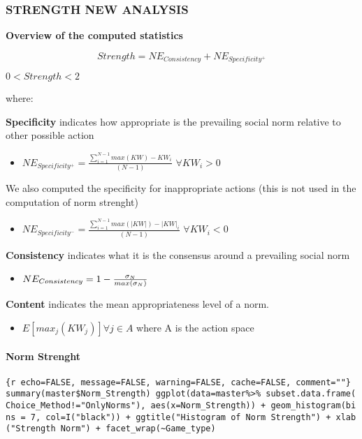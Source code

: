 \hypertarget{strength-new-analysis}{%
\subsubsection{STRENGTH NEW ANALYSIS}\label{strength-new-analysis}}

\textbf{Overview of the computed statistics}

\[Strength = {NE_{Consistency}+NE_{Specificity^+}}\]

\(0 < Strength < 2\)

where:

\textbf{Specificity} indicates how appropriate is the prevailing social
norm relative to other possible action

\begin{itemize}
\tightlist
\item
  \(NE_{Specificity^+} = \frac{{\sum_{i=1}^{N-1} max(KW)-KW_i}}{(N-1)}\)
  \(\forall KW_i > 0\)
\end{itemize}

We also computed the specificity for inappropriate actions (this is not
used in the computation of norm strenght)

\begin{itemize}
\tightlist
\item
  \(NE_{Specificity^-} = \frac{{\sum_{i=1}^{N-1} max(|KW|)-|KW|_i}}{(N-1)}\)
  \(\forall KW_i < 0\)
\end{itemize}

\textbf{Consistency} indicates what it is the consensus around a
prevailing social norm

\begin{itemize}
\tightlist
\item
  \(NE_{Consistency} = 1- {\sigma_{N} \over max(\sigma_{N})}\)
\end{itemize}

\textbf{Content} indicates the mean appropriateness level of a norm.

\begin{itemize}
\tightlist
\item
  \(E[max_j(KW_j)] \forall j \in A\) where A is the action space
\end{itemize}

\hypertarget{norm-strenght}{%
\paragraph{Norm Strenght}\label{norm-strenght}}

\texttt{\{r\ echo=FALSE,\ message=FALSE,\ warning=FALSE,\ cache=FALSE,\ comment=""\}\ summary(master\$Norm\_Strength)\ ggplot(data=master\%\textgreater{}\%\ subset.data.frame(Choice\_Method!="OnlyNorms"),\ aes(x=Norm\_Strength))\ +\ geom\_histogram(bins\ =\ 7,\ col=I("black"))\ +\ ggtitle("Histogram\ of\ Norm\ Strength")\ +\ xlab("Strength\ Norm")\ +\ facet\_wrap(\textasciitilde{}Game\_type)}

